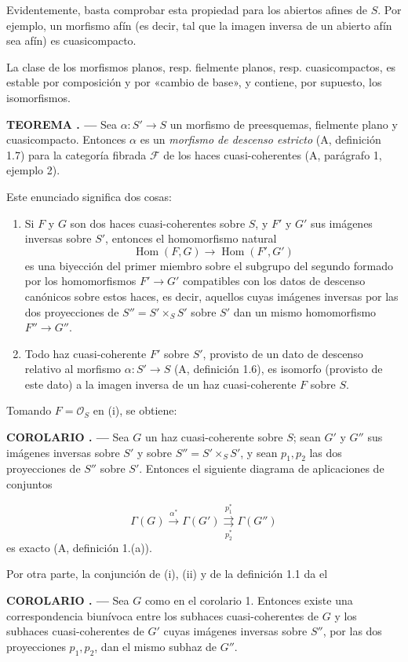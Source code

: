 \documentclass[11pt,twoside,openany]{book}
\numberwithin{equation}{section}
\newcommand{\src}[1]{%
  \phantomsection\hypertarget{src:#1}{}%
  \marginpar{\raggedleft\footnotesize\sffamily #1}%
}
\theoremstyle{plain}
\theoremstyle{definition}
\theoremstyle{remark}
\newcommand{\result}[2]{%
  \par\medskip\noindent\textbf{#1%
  \if\relax\detokenize{#2}\relax\else\space#2\fi. ---}\enspace
}
\newcommand{\FgaUnitKey}{frontmatter}
\renewcommand{\src}[1]{%
  \phantomsection\hypertarget{src:\FgaUnitKey:#1}{}%
  \marginpar{\raggedleft\footnotesize\sffamily #1}%
}
\theoremstyle{plain}
\theoremstyle{definition}
\theoremstyle{remark}
\begin{document}
Evidentemente, basta comprobar esta propiedad para los abiertos afines de $S$.
Por ejemplo, un morfismo afín (es decir, tal que la imagen inversa de un abierto
afín sea afín) es cuasicompacto.

La clase de los morfismos planos, resp. fielmente planos, resp. cuasicompactos,
es estable por composición y por «cambio de base», y contiene, por supuesto,
los isomorfismos.

\result{TEOREMA}{1} Sea $\alpha:S'\longrightarrow S$ un morfismo de
preesquemas, fielmente plano y cuasicompacto. Entonces $\alpha$ es un
\emph{morfismo de descenso estricto} (A, definición 1.7) para la categoría
fibrada $\mathcal F$ de los haces cuasi-coherentes (A, parágrafo 1, ejemplo 2).

Este enunciado significa dos cosas:
\begin{enumerate}
\item[(i)] Si $F$ y $G$ son dos haces cuasi-coherentes sobre $S$, y $F'$ y
$G'$ sus imágenes inversas sobre $S'$, entonces el homomorfismo natural
\[
  \operatorname{Hom}(F,G)\longrightarrow\operatorname{Hom}(F',G')
\]
es una biyección del primer miembro sobre el subgrupo del segundo formado por
los homomorfismos $F'\longrightarrow G'$ compatibles con los datos de descenso
canónicos sobre estos haces, es decir, aquellos cuyas imágenes inversas por
las dos proyecciones de $S''=S'\times_SS'$ sobre $S'$ dan un mismo
homomorfismo $F''\longrightarrow G''$.
\item[(ii)] Todo haz cuasi-coherente $F'$ sobre $S'$, provisto de un dato de
descenso relativo al morfismo $\alpha:S'\longrightarrow S$
(A, definición 1.6), es isomorfo (provisto de este dato) a la imagen inversa de
un haz cuasi-coherente $F$ sobre $S$.
\end{enumerate}
Tomando $F=\mathcal O_S$ en (i), se obtiene:

\result{COROLARIO}{1} Sea $G$ un haz cuasi-coherente sobre $S$; sean
$G'$ y $G''$ sus imágenes inversas sobre $S'$ y sobre
$S''=S'\times_SS'$, y sean $p_1,p_2$ las dos proyecciones de $S''$ sobre
$S'$. Entonces el siguiente diagrama de aplicaciones de conjuntos

\src{316}
\[
  \Gamma(G)\xrightarrow{\alpha^*}\Gamma(G')
  \underset{p_2^*}{\overset{p_1^*}{\rightrightarrows}}\Gamma(G'')
\]
es exacto (A, definición 1.(a)).

Por otra parte, la conjunción de (i), (ii) y de la definición 1.1 da el

\result{COROLARIO}{2} Sea $G$ como en el corolario 1. Entonces existe una
correspondencia biunívoca entre los subhaces cuasi-coherentes de $G$ y los
subhaces cuasi-coherentes de $G'$ cuyas imágenes inversas sobre $S''$, por las
dos proyecciones $p_1,p_2$, dan el mismo subhaz de $G''$.
\end{document}
